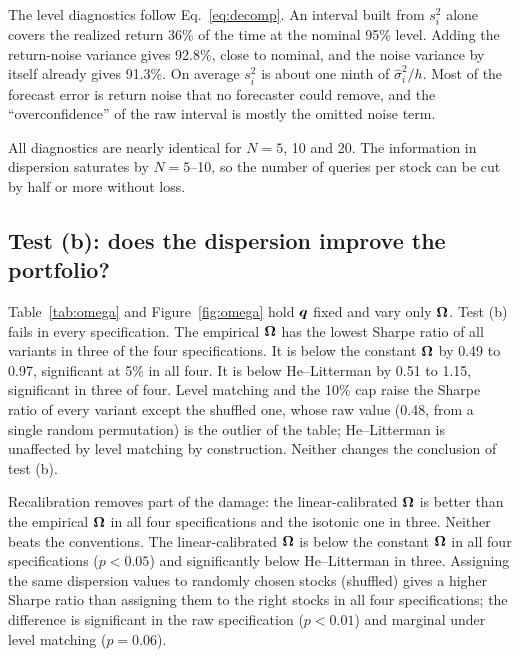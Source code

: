 The level diagnostics follow Eq.~\eqref{eq:decomp}. An interval built from $s_i^2$ alone covers the realized return 36\% of the time at the nominal 95\% level. Adding the return-noise variance gives 92.8\%, close to nominal, and the noise variance by itself already gives 91.3\%. On average $s_i^2$ is about one ninth of $\hat\sigma_i^2/h$. Most of the forecast error is return noise that no forecaster could remove, and the ``overconfidence'' of the raw interval is mostly the omitted noise term.

All diagnostics are nearly identical for $N=5$, 10 and 20. The information in dispersion saturates by $N=5$--10, so the number of queries per stock can be cut by half or more without loss.

\begin{table}[t]
\centering
\caption{Dispersion as an uncertainty signal. $e^2=(q_i-\bar r_i)^2$, $\hat\sigma^2$ the trailing 126-day variance, $h$ the number of trading days in the holding period. $N=5$ and $10$ are averages over three random subsets of the 20 draws. Coverage is the share of pairs with $|q_i-\bar r_i| \le 1.96\times$ the stated standard deviation. 1{,}700 pairs over 34 dates.}
\label{tab:calib}
\small

\end{table}

\subsection{Test (b): does the dispersion improve the portfolio?}\label{sec:res_b}
Table~\ref{tab:omega} and Figure~\ref{fig:omega} hold $\bm{q}$ fixed and vary only $\bm{\Omega}$. Test (b) fails in every specification. The empirical $\bm{\Omega}$ has the lowest Sharpe ratio of all variants in three of the four specifications. It is below the constant $\bm{\Omega}$ by 0.49 to 0.97, significant at 5\% in all four. It is below He--Litterman by 0.51 to 1.15, significant in three of four. Level matching and the 10\% cap raise the Sharpe ratio of every variant except the shuffled one, whose raw value (0.48, from a single random permutation) is the outlier of the table; He--Litterman is unaffected by level matching by construction. Neither changes the conclusion of test (b).

Recalibration removes part of the damage: the linear-calibrated $\bm{\Omega}$ is better than the empirical $\bm{\Omega}$ in all four specifications and the isotonic one in three. Neither beats the conventions. The linear-calibrated $\bm{\Omega}$ is below the constant $\bm{\Omega}$ in all four specifications ($p<0.05$) and significantly below He--Litterman in three. Assigning the same dispersion values to randomly chosen stocks (shuffled) gives a higher Sharpe ratio than assigning them to the right stocks in all four specifications; the difference is significant in the raw specification ($p<0.01$) and marginal under level matching ($p=0.06$).

